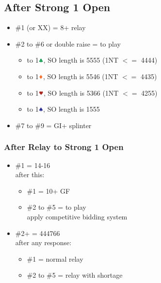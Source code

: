 \documentclass{article}
\newcommand*{\ccc}{\textcolor{ForestGreen}{\clubsuit}}
\newcommand*{\ddd}{\textcolor{Orange}{\vardiamondsuit}}
\newcommand*{\hhh}{\textcolor{Mahogany}{\varheartsuit}}
\newcommand*{\sss}{\textcolor{Blue}{\spadesuit}}
\begin{document}
\begin{multicols}{2}
\subsection{After Strong 1 Open}
\begin{itemize}
    \setlength\itemsep{-0.2em}
    \item \#1 (or XX) = 8+ relay
    \item \#2 to \#6 or double raise = to play
    \begin{itemize}
        \setlength\itemsep{-0.2em}
        \item to 1$\ccc$, SO length is 5555 (1NT $<=$ 4444)
        \item to 1$\ddd$, SO length is 5546 (1NT $<=$ 4435)
        \item to 1$\hhh$, SO length is 5366 (1NT $<=$ 4255)
        \item to 1$\sss$, SO length is 1555
    \end{itemize}
    \item \#7 to \#9 = GI+ splinter
\end{itemize}

\subsubsection{After Relay to Strong 1 Open}
\begin{itemize}
    \setlength\itemsep{-0.2em}
    \item \#1 = 14-16 \\
        after this:
        \begin{itemize}
            \setlength\itemsep{-0.2em}
            \item \#1 = 10+ GF
            \item \#2 to \#5 = to play \\
                apply competitive bidding system
        \end{itemize}
    \item \#2+ = 444766 \\
        after any response:
        \begin{itemize}
            \setlength\itemsep{-0.2em}
            \item \#1 = normal relay
            \item \#2 to \#5 = relay with shortage
        \end{itemize}
\end{itemize}


\end{multicols}
\end{document}
